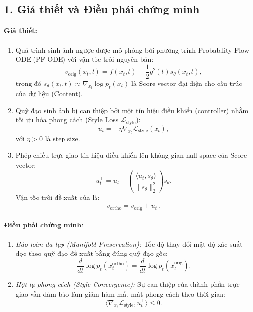 \documentclass[runningheads]{llncs}
\begin{document}
\subsection*{1. Giả thiết và Điều phải chứng minh}

\paragraph{Giả thiết:}
\begin{enumerate}
    \item Quá trình sinh ảnh ngược được mô phỏng bởi phương trình Probability Flow ODE (PF-ODE) với vận tốc trôi nguyên bản: 
    \begin{equation}
        v_{\text{orig}}(x_t, t) = f(x_t, t) - \frac{1}{2}g^2(t) s_\theta(x_t, t),
    \end{equation}
    trong đó $s_\theta(x_t, t) \approx \nabla_{x_t} \log p_t(x_t)$ là Score vector đại diện cho cấu trúc của dữ liệu (Content).
    \item Quỹ đạo sinh ảnh bị can thiệp bởi một tín hiệu điều khiển (controller) nhằm tối ưu hóa phong cách (Style Loss $\mathcal{L}_{\text{style}}$): 
    \begin{equation}
        u_t = -\eta \nabla_{x_t} \mathcal{L}_{\text{style}}(x_t),
    \end{equation}
    với $\eta > 0$ là step size.
    \item Phép chiếu trực giao tín hiệu điều khiển lên không gian null-space của Score vector:
    \begin{equation}
        u_t^\perp = u_t - \left( \frac{\langle u_t, s_\theta \rangle}{\|s_\theta\|_2^2} \right) s_\theta.
    \end{equation}
    Vận tốc trôi đề xuất của \method là: 
    \begin{equation}
        v_{\text{ortho}} = v_{\text{orig}} + u_t^\perp.
    \end{equation}
\end{enumerate}

\paragraph{Điều phải chứng minh:}
\begin{enumerate}
    \item \textit{Bảo toàn đa tạp (Manifold Preservation):} Tốc độ thay đổi mật độ xác suất dọc theo quỹ đạo đề xuất bằng đúng quỹ đạo gốc: 
    \begin{equation}
        \frac{d}{dt} \log p_t(x_t^{\text{ortho}}) = \frac{d}{dt} \log p_t(x_t^{\text{orig}}).
    \end{equation}
    \item \textit{Hội tụ phong cách (Style Convergence):} Sự can thiệp của thành phần trực giao vẫn đảm bảo làm giảm hàm mất mát phong cách theo thời gian: 
    \begin{equation}
        \langle \nabla_{x_t} \mathcal{L}_{\text{style}}, u_t^\perp \rangle \le 0.
    \end{equation}
\end{enumerate}
\end{document}
